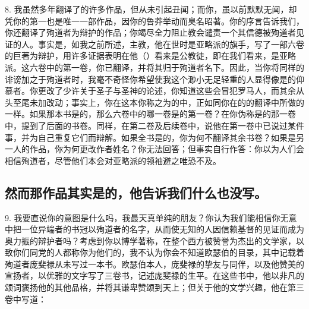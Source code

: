 8. 我虽然多年翻译了的许多作品，但从未引起丑闻；而你，虽以前默默无闻，却凭你的第一也是唯一一部作品，因你的鲁莽举动而臭名昭著。你的序言告诉我们，你还翻译了殉道者为辩护的作品；你竭尽全力阻止教会谴责一个其信德被殉道者见证的人。事实是，如我之前所述，主教，他在世时是亚略派的旗手，写了一部六卷的巨著为辩护，用许多证据表明在他（）看来是公教徒，即在我们看来，是亚略派。这六卷中的第一卷，你已翻译，并将其归于殉道者名下。因此，当你将同样的诽谤加之于殉道者时，我毫不奇怪你希望使我这个渺小无足轻重的人显得像是的仰慕者。你更改了少许关于圣子与圣神的论述，你知道这些会冒犯罗马人，而其余从头至尾未加改动；事实上，你在这本你称之为的中，正如同你在的的翻译中所做的一样。如果那本书是的，那么六卷中的哪一卷是的第一卷？在你伪称是的那一卷中，提到了后面的书卷。同样，在第二卷及后续卷中，说他在第一卷中已说过某件事，并为自己重复它们而辩解。如果全书是的，你为何不翻译其余书卷？如果是另一人的作品，你为何更改作者姓名？你无法回答；但事实自行作答：你以为人们会相信殉道者，尽管他们本会对亚略派的领袖避之唯恐不及。\par


\subsection{然而那作品其实是的，他告诉我们什么也没写。}

9. 我要直说你的意图是什么吗，我最天真单纯的朋友？你认为我们能相信你无意中把一位异端者的书冠以殉道者的名字，从而使无知的人因信赖基督的见证而成为奥力振的辩护者吗？考虑到你以博学著称，在整个西方被赞誉为杰出的文学家，以致你们同党的人都称你为他们的，我不认为你会不知道欧瑟伯的目录，其中记载着殉道者庞斐禄从未写过一本书。欧瑟伯本人，庞斐禄的挚友与同伴，以及他赞美的宣扬者，以优雅的文字写了三卷书，记述庞斐禄的生平。在这些书中，他以非凡的颂词褒扬他的其他品格，并将其谦卑赞颂到天上；但关于他的文学兴趣，他在第三卷中写道：\par

